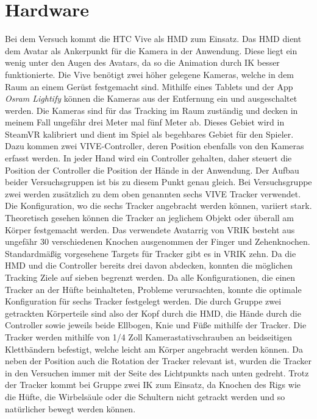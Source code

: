\section{Hardware}
Bei dem Versuch kommt die HTC Vive als HMD zum Einsatz. Das HMD dient dem Avatar als Ankerpunkt für die Kamera in der Anwendung. Diese liegt ein wenig unter den Augen des Avatars, da so die Animation durch IK besser funktionierte. Die Vive benötigt zwei höher gelegene Kameras, welche in dem Raum an einem Gerüst festgemacht sind. Mithilfe eines Tablets und der App \textit{Osram Lightify} können die Kameras aus der Entfernung ein und ausgeschaltet werden. Die Kameras sind für das Tracking im Raum zuständig und decken in meinem Fall ungefähr drei Meter mal fünf Meter ab. Dieses Gebiet wird in SteamVR kalibriert und dient im Spiel als begehbares Gebiet für den Spieler.
Dazu kommen zwei VIVE-Controller, deren Position ebenfalls von den Kameras erfasst werden. In jeder Hand wird ein Controller gehalten, daher steuert die Position der Controller die Position der Hände in der Anwendung.  Der Aufbau beider Versuchsgruppen ist bis zu diesem Punkt genau gleich.
Bei Versuchsgruppe zwei werden zusätzlich zu dem oben genannten sechs VIVE Tracker verwendet. Die Konfiguration, wo die sechs Tracker angebracht werden können, variiert stark. Theoretisch gesehen können die Tracker an jeglichem Objekt oder überall am Körper festgemacht werden. Das verwendete Avatarrig von VRIK besteht aus ungefähr 30 verschiedenen Knochen ausgenommen der Finger und Zehenknochen. Standardmäßig vorgesehene Targets für Tracker gibt es in VRIK zehn. Da die HMD und die Controller bereits drei davon abdecken, konnten die möglichen Tracking Ziele auf sieben begrenzt werden. Da alle Konfigurationen, die einen Tracker an der Hüfte beinhalteten, Probleme verursachten, konnte die optimale Konfiguration für sechs Tracker festgelegt werden. Die durch Gruppe zwei getrackten Körperteile sind also der Kopf durch die HMD, die Hände durch die Controller sowie jeweils beide Ellbogen, Knie und Füße mithilfe der Tracker. 
Die Tracker werden mithilfe von 1/4 Zoll Kamerastativschrauben an beidseitigen Klettbändern befestigt, welche leicht am Körper angebracht werden können. Da neben der Position auch die Rotation der Tracker relevant ist, wurden die Tracker in den Versuchen immer mit der Seite des Lichtpunkts nach unten gedreht.
Trotz der Tracker kommt bei Gruppe zwei IK zum Einsatz, da Knochen des Rigs wie die Hüfte, die Wirbelsäule oder die Schultern nicht getrackt werden und so natürlicher bewegt werden können.

